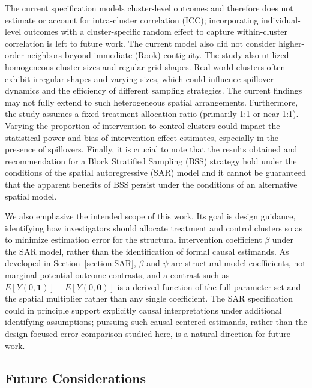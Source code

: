 \documentclass{article}[11pt]
\begin{document}
The current specification models cluster-level outcomes and therefore does not estimate or account for intra-cluster correlation (ICC); incorporating individual-level outcomes with a cluster-specific random effect to capture within-cluster correlation is left to future work. The current model also did not consider higher-order neighbors beyond immediate (Rook) contiguity. The study also utilized homogeneous cluster sizes and regular grid shapes. Real-world clusters often exhibit irregular shapes and varying sizes, which could influence spillover dynamics and the efficiency of different sampling strategies. The current findings may not fully extend to such heterogeneous spatial arrangements. Furthermore, the study assumes a fixed treatment allocation ratio (primarily 1:1 or near 1:1). Varying the proportion of intervention to control clusters could impact the statistical power and bias of intervention effect estimates, especially in the presence of spillovers. Finally, it is crucial to note that the results obtained and recommendation for a Block Stratified Sampling (BSS) strategy hold under the conditions of the spatial autoregressive (SAR) model and it cannot be guaranteed that the apparent benefits of BSS persist under the conditions of an alternative spatial model.

We also emphasize the intended scope of this work. Its goal is design guidance, identifying how investigators should allocate treatment and control clusters so as to minimize estimation error for the structural intervention coefficient $\beta$ under the SAR model, rather than the identification of formal causal estimands. As developed in Section~\ref{section:SAR}, $\beta$ and $\psi$ are structural model coefficients, not marginal potential-outcome contrasts, and a contrast such as $E[Y(0,\mathbf{1})] - E[Y(0,\mathbf{0})]$ is a derived function of the full parameter set and the spatial multiplier rather than any single coefficient. The SAR specification could in principle support explicitly causal interpretations under additional identifying assumptions; pursuing such causal-centered estimands, rather than the design-focused error comparison studied here, is a natural direction for future work.

\subsection{Future Considerations}\label{section:FutureConsiderations}
\end{document}
